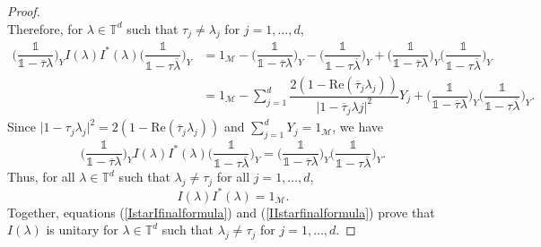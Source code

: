 \documentclass[11pt, reqno]{amsart}
\newcommand\1{\boldsymbol {1}}
\numberwithin{equation}{section}
\begin{document}
\begin{proof}
\begin{equation*}
\end{equation*}
Therefore, for $\lambda\in\mathbb{T}^{d}$ such that $\tau_{j}\neq \lambda_{j}$ for $j=1,\hdots,d$,
\begin{align*}
\Big(\dfrac{\mathds{1}}{\mathds{1}-\overline{\tau}\lambda}\Big)_{Y}I(\lambda)I^{*}(\lambda)\bigg(\dfrac{\mathds{1}}{\mathds{1}-\tau\overline{\lambda}}\bigg)_{Y}&=1_{\mathcal{M}}-\Big(\dfrac{\mathds{1}}{\mathds{1}-\overline{\tau}\lambda}\Big)_{Y}-\Big(\dfrac{\mathds{1}}{\mathds{1}-\tau\overline{\lambda}}\Big)_{Y}+\Big(\dfrac{\mathds{1}}{\mathds{1}-\overline{\tau}\lambda}\Big)_{Y}\big(\dfrac{\mathds{1}}{\mathds{1}-\tau\overline{\lambda}}\Big)_{Y}\\
    &=1_{\mathcal{M}}-\sum_{j=1}^{d}\dfrac{2(1-\mathrm{Re}(\overline{\tau}_{j}\lambda_{j}))}{\lvert1-\overline{\tau}_{j}\lambda{j}\rvert^{2}}Y_{j}+\Big(\dfrac{\mathds{1}}{\mathds{1}-\overline{\tau}\lambda}\Big)_{Y}\big(\dfrac{\mathds{1}}{\mathds{1}-\tau\overline{\lambda}}\Big)_{Y}.
\end{align*}
Since $\lvert 1-\tau_{j}\lambda_{j}\rvert^{2}=2(1-\mathrm{Re}(\overline{\tau}_{j}\lambda_{j}))$ and $\sum_{j=1}^{d}Y_{j}=1_{\mathcal{M}}$, we have
\begin{equation}\label{IIstarfinalformula}
\Big(\dfrac{\mathds{1}}{\mathds{1}-\overline{\tau}\lambda}\Big)_{Y}I(\lambda)I^{*}(\lambda)\bigg(\dfrac{\mathds{1}}{\mathds{1}-\tau\overline{\lambda}}\bigg)_{Y}=\Big(\dfrac{\mathds{1}}{\mathds{1}-\overline{\tau}\lambda}\Big)_{Y}\big(\dfrac{\mathds{1}}{\mathds{1}-\tau\overline{\lambda}}\Big)_{Y}.
\end{equation}
Thus, for all $\lambda\in\mathbb{T}^{d}$ such that $\lambda_{j}\neq\tau_{j}$ for all $j=1,\hdots,d$,
$$I(\lambda)I^{*}(\lambda)=1_{\mathcal{M}}.$$
Together, equations (\ref{IstarIfinalformula}) and (\ref{IIstarfinalformula}) prove that $I(\lambda)$ is unitary for $\lambda\in\mathbb{T}^{d}$ such that $\lambda_{j}\neq \tau_{j}$ for $j=1,\hdots,d$. 


\end{proof}
\end{document}
